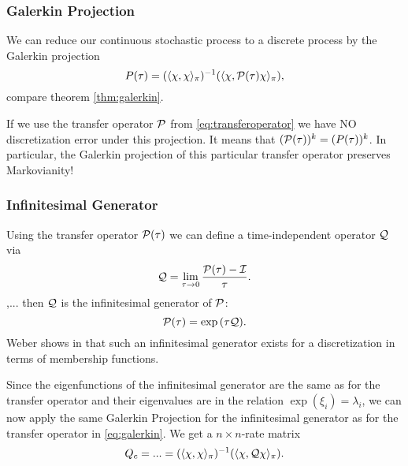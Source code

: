 \subsubsection*{Galerkin Projection}
We can reduce our continuous stochastic process to a discrete process by the Galerkin projection
\begin{equation}
\label{eq:galerkin}
P(\tau) = (\langle \chi, \chi \rangle_\pi)^{-1} (\langle \chi, \mathcal{P}(\tau) \chi \rangle_\pi),
\end{equation}
compare theorem \ref{thm:galerkin}.

If we use the transfer operator $\mathcal{P}$ from \eqref{eq:transferoperator} we have NO discretization error under this projection. It means that $(\mathcal{P}(\tau))^k = (P(\tau))^k$. In particular, the Galerkin projection of this particular transfer operator preserves Markovianity!


\subsubsection*{Infinitesimal Generator}
Using the transfer operator $\mathcal{P}(\tau)$ we can define a time-independent operator $\mathcal{Q}$ via
\begin{equation}
\mathcal{Q} = \lim_{\tau \rightarrow 0} \frac{\mathcal{P}(\tau)-\mathcal{I}}{\tau}.
\end{equation}
,... then $\mathcal{Q}$ is the infinitesimal generator of $\mathcal{P}$:
\begin{equation}
\mathcal{P}(\tau) = \exp{(\tau\mathcal{Q})}.
\end{equation}
Weber shows in \cite{weber2011subspace} that such an infinitesimal generator exists for a discretization in terms of membership functions.

Since the eigenfunctions of the infinitesimal generator are the same as for the transfer operator and their eigenvalues are in the relation $\exp{(\xi_i)} = \lambda_i$, we can now apply the same Galerkin Projection for the infinitesimal generator as for the transfer operator in \eqref{eq:galerkin}.
We get a $n\times n$-rate matrix
\begin{equation}
Q_c = ... = (\langle \chi, \chi \rangle_\pi)^{-1} (\langle \chi, \mathcal{Q} \chi \rangle_\pi).
\end{equation}

